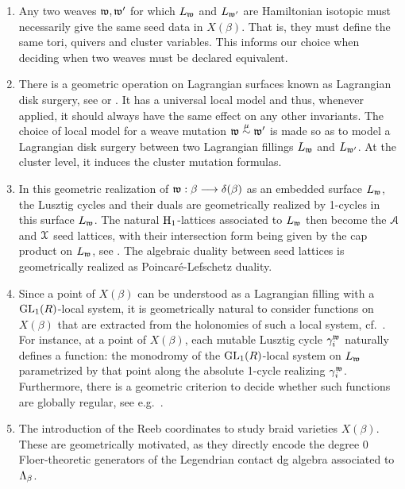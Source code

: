 \begin{enumerate}
    \item Any two weaves $\mathfrak{w},\mathfrak{w}'$ for which $L_{\mathfrak{w}}$ and $L_{\mathfrak{w}'}$ are Hamiltonian isotopic must necessarily give the same seed data in $X(\beta)$. That is, they must define the same tori, quivers and cluster variables. This informs our choice when deciding when two weaves must be declared equivalent.\\

    \item There is a geometric operation on Lagrangian surfaces known as Lagrangian disk surgery, see \cite{Polterovich_Surgery} or . It has a universal local model and thus, whenever applied, it should always have the same effect on any other invariants. The choice of local model for a weave mutation $\mathfrak{w}\stackrel{\mu}{\sim}{\mathfrak{w}'}$ is made so as to model a Lagrangian disk surgery between two Lagrangian fillings $L_{\mathfrak{w}}$ and $L_{\mathfrak{w}'}$. At the cluster level, it induces the cluster mutation formulas.\\

    \item In this geometric realization of $\mathfrak{w}:\beta\longrightarrow\delta(\beta)$ as an embedded surface $L_{\mathfrak{w}}$, the Lusztig cycles and their duals are geometrically realized by 1-cycles in this surface $L_{\mathfrak{w}}$. The natural $\operatorname{H}_1$-lattices associated to $L_{\mathfrak{w}}$ then become the $\mathcal{A}$ and $\mathcal{X}$ seed lattices, with their intersection form being given by the cap product on $L_{\mathfrak{w}}$, see . The algebraic duality between seed lattices is geometrically realized as Poincar\'e-Lefschetz duality.\\

    \item Since a point of $X(\beta)$ can be understood as a Lagrangian filling with a $\operatorname{GL}_1(R)$-local system, it is geometrically natural to consider functions on $X(\beta)$ that are extracted from the holonomies of such a local system, cf.~. For instance, at a point of $X(\beta)$, each mutable Lusztig cycle $\gamma_i^{\mathfrak{w}}$ naturally defines a function: the monodromy of the $\operatorname{GL}_1(R)$-local system on $L_{\mathfrak{w}}$ parametrized by that point along the absolute 1-cycle realizing $\gamma_i^{\mathfrak{w}}$. Furthermore, there is a geometric criterion to decide whether such functions are globally regular, see e.g.~\cite[Corollary 1.2]{CasalsLi24}.\\

    \item The introduction of the Reeb coordinates to study braid varieties $X(\beta)$. These are geometrically motivated, as they directly encode the degree 0 Floer-theoretic generators of the Legendrian contact dg algebra associated to $\Lambda_\beta$.
\end{enumerate}

